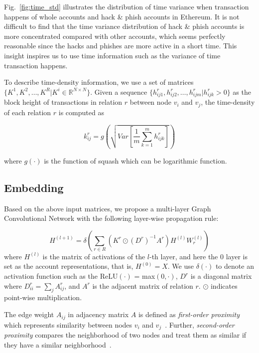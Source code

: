 Fig.~\ref{fig:time_std} illustrates the distribution of time variance when transaction happens of whole accounts and hack \& phish accounts in Ethereum. It is not difficult to find that the time variance distribution of hack \& phish accounts is more concentrated compared with other accounts, which seems perfectly reasonable since the hacks and phishes are more active in a short time. This insight inspires us to use time information such as the variance of time transaction happens.

To describe time-density information, we use a set of matrices $\{K^1,K^2,\dots,K^R|K^i\in \mathbb{R}^{N \times N}\}$. Given a sequence $\{h_{ij1}^r,h_{ij2}^r,\dots,h_{ijm}^r | h_{ijk}^r>0\}$ as the block height of transactions in relation $r$ between node $v_i$ and $v_j$, the time-density of each relation $r$ is computed as%

\begin{equation}
k_{ij}^r=g(\sqrt{Var[\frac{1}{m}\sum_{k=1}^m h_{ijk}^r]})
\label{eq:time}
\end{equation}

\noindent where $g(\cdot)$ is the function of squash which can be logarithmic function.

\subsection{Embedding}
\label{sec:rGCN layers}
Based on the above input matrices, we propose a multi-layer Graph Convolutional Network with the following layer-wise propagation rule:

\begin{equation}
H^{(l+1)}=\delta(\sum_{r\in R} (K^r\odot (D^r)^{-1}A^r)H^{(l)}W_r^{(l)})
\end{equation}
\noindent where $H^{(l)}$ is the matrix of activations of the $l$-th layer, and here the $0$ layer is set as the account representations, that is, $H^{(0)}=X$. We use $\delta(\cdot)$ to denote an activation function such as the ReLU$(\cdot)$ = max$(0,\cdot)$, $D^r$ is a diagonal matrix where $D^r_{ii}=\sum_{j}A^r_{ij}$, and $A^r$ is the adjacent matrix of relation $r$. $\odot$ indicates point-wise multiplication.

The edge weight $A_{ij}$ in adjacency matrix $A$ is defined as \emph{first-order proximity} which represents similarity between nodes $v_i$ and $v_j$~\cite{tang2015line}. Further, \emph{second-order proximity} compares the neighborhood of two nodes and treat them as similar if they have a similar neighborhood~\cite{goyal2018graph}.

